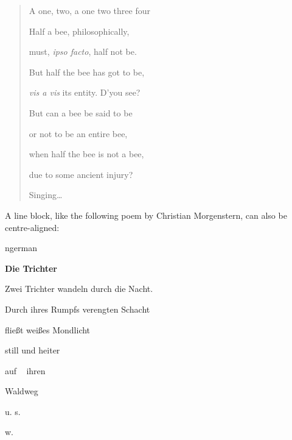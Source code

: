 \documentclass[a4paper]{article}
\newenvironment{DUlineblock}[1]{%
    \list{}{\setlength{\partopsep}{\parskip}
            \addtolength{\partopsep}{\baselineskip}
            \setlength{\topsep}{0pt}
            \setlength{\itemsep}{0.15\baselineskip}
            \setlength{\parsep}{0pt}
            \setlength{\leftmargin}{#1}}
    \raggedright
  }
  {\endlist}
\begin{document}
\begin{quote}
\begin{DUlineblock}{0em}
\item[] A one, two, a one two three four
\item[] 
\item[] Half a bee, philosophically,
\item[]
\begin{DUlineblock}{\DUlineblockindent}
\item[] must, \emph{ipso facto}, half not be.
\end{DUlineblock}
\item[] But half the bee has got to be,
\item[]
\begin{DUlineblock}{\DUlineblockindent}
\item[] \emph{vis a vis} its entity.  D’you see?
\item[] 
\end{DUlineblock}
\item[] But can a bee be said to be
\item[]
\begin{DUlineblock}{\DUlineblockindent}
\item[] or not to be an entire bee,
\item[]
\begin{DUlineblock}{\DUlineblockindent}
\item[] when half the bee is not a bee,
\item[]
\begin{DUlineblock}{\DUlineblockindent}
\item[] due to some ancient injury?
\item[] 
\end{DUlineblock}
\end{DUlineblock}
\end{DUlineblock}
\item[] Singing…
\end{DUlineblock}
\end{quote}

A line block, like the following poem by Christian Morgenstern, can
also be centre-aligned:

\begin{selectlanguage}{ngerman}
\begin{DUlineblock}{0em}
\centering
\item[] \textbf{Die Trichter}
\item[] 
\item[] Zwei Trichter wandeln durch die Nacht.
\item[] Durch ihres Rumpfs verengten Schacht
\item[] fließt weißes Mondlicht
\item[] still und heiter
\item[] auf   ihren
\item[] Waldweg
\item[] u. s.
\item[] w.
\item[] 
\end{DUlineblock}
\end{selectlanguage}
\end{document}
